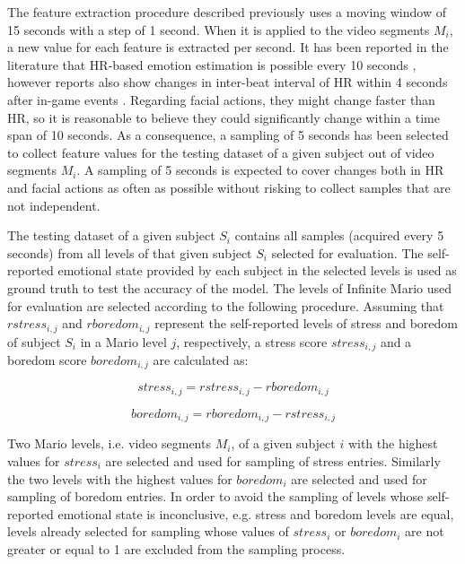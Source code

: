 The feature extraction procedure described previously uses a moving window of 15 seconds with a step of 1 second. When it is applied to the video segments $M_i$, a new value for each feature is extracted per second. It has been reported in the literature that HR-based emotion estimation is possible every 10 seconds \parencite{valenza2014revealing}, however reports also show changes in inter-beat interval of HR within 4 seconds after in-game events \parencite{ravaja20051}. Regarding facial actions, they might change faster than HR, so it is reasonable to believe they could significantly change within a time span of 10 seconds. As a consequence, a sampling of 5 seconds has been selected to collect feature values for the testing dataset of a given subject out of video segments $M_i$. A sampling of 5 seconds is expected to cover changes both in HR and facial actions as often as possible without risking to collect samples that are not independent.

The testing dataset of a given subject $S_i$ contains all samples (acquired every 5 seconds) from all levels of that given subject $S_i$ selected for evaluation. The self-reported emotional state provided by each subject in the selected levels is used as ground truth to test the accuracy of the model. The levels of Infinite Mario used for evaluation are selected according to the following procedure. Assuming that $rstress_{i,j}$ and $rboredom_{i,j}$ represent the self-reported levels of stress and boredom of subject $S_i$ in a Mario level $j$, respectively, a stress score $stress_{i,j}$ and a boredom score $boredom_{i,j}$ are calculated as:

\begin{equation}
  stress_{i,j} = rstress_{i,j} - rboredom_{i,j}
  \label{eq:stress-score}
\end{equation}

\begin{equation}
  boredom_{i,j} = rboredom_{i,j} - rstress_{i,j}
  \label{eq:boredom-score}
\end{equation}

Two Mario levels, i.e. video segments $M_i$, of a given subject $i$ with the highest values for $stress_i$ are selected and used for sampling of stress entries. Similarly the two levels with the highest values for $boredom_i$ are selected and used for sampling of boredom entries. In order to avoid the sampling of levels whose self-reported emotional state is inconclusive, e.g. stress and boredom levels are equal, levels already selected for sampling whose values of $stress_i$ or $boredom_i$ are not greater or equal to 1 are excluded from the sampling process.

